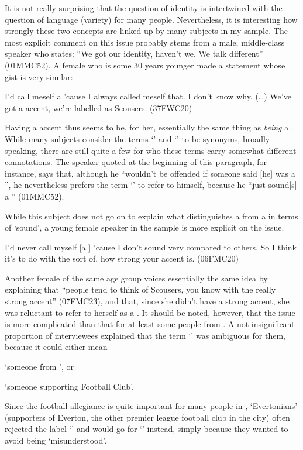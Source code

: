 It is not really surprising that the question of identity is intertwined with the question of language (variety) for many people.
Nevertheless, it is interesting how strongly these two concepts are linked up by many subjects in my sample.
The most explicit comment on this issue probably stems from a male, middle-class speaker who states: ``We got our identity, haven't we. We talk different'' (01MMC52).
A female who is some 30 years younger made a statement whose gist is very similar:
\begin{example}
	I'd call meself a  'cause I always called meself that. I don't know why. (\ldots) We've got a  accent, we're labelled as Scousers. (37FWC20)
\end{example}
Having a  accent thus seems to be, for her, essentially the same thing as \emph{being} a .
While many subjects consider the terms `' and `' to be synonyms, broadly speaking, there are still quite a few for who these terms carry somewhat different connotations.
The speaker quoted at the beginning of this paragraph, for instance, says that, although he ``wouldn't be offended if someone said [he] was a '', he nevertheless prefers the term `' to refer to himself, because he ``just sound[s] a '' (01MMC52).

While this subject does not go on to explain what distinguishes a  from a  in terms of `sound', a young female speaker in the sample is more explicit on the issue.
\begin{example}
	I'd never call myself [a ] 'cause I don't sound very  compared to others. So I think it's to do with the sort of, how strong your accent is. (06FMC20)
\end{example}
Another female of the same age group voices essentially the same idea by explaining that ``people tend to think of Scousers, you know with the really strong accent'' (07FMC23), and that, since she didn't have a strong accent, she was reluctant to refer to herself as a .
It should be noted, however, that the issue is more complicated than that for at least some people from .
A not insignificant proportion of interviewees explained that the term `' was ambiguous for them, because it could either mean
\begin{inparaenum}[(1)]
	\item `someone from ', or
	\item `someone supporting  Football Club'.
\end{inparaenum}
Since the football allegiance is quite important for many people in , `Evertonians' (supporters of Everton, the other premier league football club in the city) often rejected the label `' and would go for `' instead, simply because they wanted to avoid being `misunderstood'.

